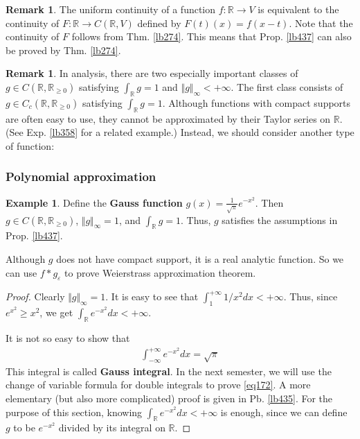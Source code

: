 \documentclass[12pt,b5paper,notitlepage]{article}
\theoremstyle{definition}
\newtheorem{eg}[df]{Example}
\newtheorem{rem}[df]{Remark}
\theoremstyle{plain}
\newcommand{\Rbb}{\mathbb R}
\newcommand{\dps}{\displaystyle}
\newcommand{\eps}{\varepsilon}
\numberwithin{equation}{section}
\begin{document}
\begin{rem}
The uniform continuity of a function $f:\Rbb\rightarrow V$ is equivalent to the continuity of $F:\Rbb\rightarrow C(\Rbb,V)$ defined by $F(t)(x)=f(x-t)$. Note that the continuity of $F$ follows from Thm. \ref{lb274}. This means that Prop. \ref{lb437} can also be proved by Thm. \ref{lb274}.
\end{rem}




\begin{rem}
In analysis, there are two especially important classes of  $g\in C(\Rbb,\Rbb_{\geq0})$ satisfying $\int_\Rbb g=1$ and $\Vert g\Vert_\infty<+\infty$. The first class consists of $g\in C_c(\Rbb,\Rbb_{\geq0})$ satisfying $\int_\Rbb g=1$. Although functions with compact supports are often easy to use, they cannot be approximated by their Taylor series on $\Rbb$. (See Exp. \ref{lb358} for a related example.) Instead, we should consider another type of function:
\end{rem}


\subsubsection{Polynomial approximation}



\begin{eg}
Define the \textbf{Gauss function} $\dps g(x)=\frac 1{\sqrt\pi}e^{-x^2}$.  Then $g\in C(\Rbb,\Rbb_{\geq0})$, $\Vert g\Vert_\infty=1$, and $\int_\Rbb g=1$. Thus, $g$ satisfies the assumptions in Prop. \ref{lb437}. 
\end{eg}

Although $g$ does not have compact support, it is a real analytic function. So we can use $f*g_\eps$ to prove Weierstrass approximation theorem.

\begin{proof}
Clearly $\Vert g\Vert_\infty=1$. It is easy to see that $\int_1^{+\infty}1/x^2dx<+\infty$. Thus, since $e^{x^2}\geq x^2$, we get $\int_\Rbb e^{-x^2}dx<+\infty$.

It is not so easy to show that 
\begin{align} \label{eq172}
\int_{-\infty}^{+\infty}e^{-x^2}dx=\sqrt\pi
\end{align}
This integral is called  \textbf{Gauss integral}.  In the next semester, we will use the change of variable formula for double integrals to prove \eqref{eq172}.
A more elementary (but also more complicated) proof is given in Pb. \ref{lb435}. For the purpose of this section, knowing $\int_\Rbb e^{-x^2}dx<+\infty$ is enough, since we can define $g$ to be $e^{-x^2}$ divided by its integral on $\Rbb$.
\end{proof}
\end{document}
